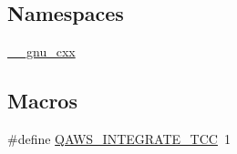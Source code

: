 \subsection*{Namespaces}
\begin{DoxyCompactItemize}
\item 
 \hyperlink{namespace____gnu__cxx}{\+\_\+\+\_\+gnu\+\_\+cxx}
\end{DoxyCompactItemize}
\subsection*{Macros}
\begin{DoxyCompactItemize}
\item 
\#define \hyperlink{qaws__integrate_8tcc_a99bad11762e66be8ed88dcdf60b81098}{Q\+A\+W\+S\+\_\+\+I\+N\+T\+E\+G\+R\+A\+T\+E\+\_\+\+T\+CC}~1
\end{DoxyCompactItemize}
